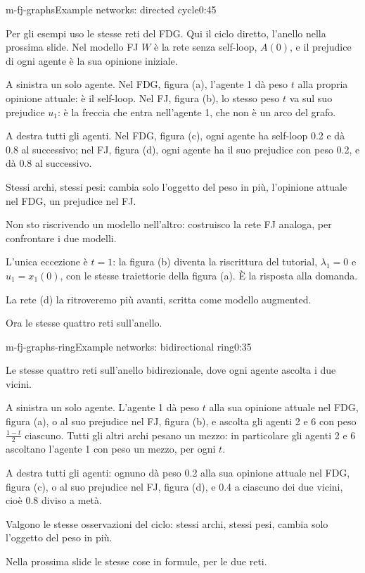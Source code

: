 \begin{slide}{m-fj-graphs}{Example networks: directed cycle}{0:45}
  \begin{discorso}
    \item Per gli esempi uso le stesse reti del FDG. Qui il ciclo diretto, l'anello nella prossima slide. Nel modello FJ $W$ è la rete senza self-loop, $A(0)$, e il prejudice di ogni agente è la sua opinione iniziale.
    \item A sinistra un solo agente. Nel FDG, figura (a), l'agente 1 dà peso $t$ alla propria opinione attuale: è il self-loop. Nel FJ, figura (b), lo stesso peso $t$ va sul suo prejudice $u_1$: è la freccia che entra nell'agente 1, che non è un arco del grafo.
    \item A destra tutti gli agenti. Nel FDG, figura (c), ogni agente ha self-loop 0.2 e dà 0.8 al successivo; nel FJ, figura (d), ogni agente ha il suo prejudice con peso 0.2, e dà 0.8 al successivo.
    \item Stessi archi, stessi pesi: cambia solo l'oggetto del peso in più, l'opinione attuale nel FDG, un prejudice nel FJ.
    \item Non sto riscrivendo un modello nell'altro: costruisco la rete FJ analoga, per confrontare i due modelli.
    \item L'unica eccezione è $t=1$: la figura (b) diventa la riscrittura del tutorial, $\lambda_1=0$ e $u_1=x_1(0)$, con le stesse traiettorie della figura (a). È la risposta alla domanda.
    \item La rete (d) la ritroveremo più avanti, scritta come modello augmented.
    \item Ora le stesse quattro reti sull'anello.
  \end{discorso}
\end{slide}

\begin{slide}{m-fj-graphs-ring}{Example networks: bidirectional ring}{0:35}
  \begin{discorso}
    \item Le stesse quattro reti sull'anello bidirezionale, dove ogni agente ascolta i due vicini.
    \item A sinistra un solo agente. L'agente 1 dà peso $t$ alla sua opinione attuale nel FDG, figura (a), o al suo prejudice nel FJ, figura (b), e ascolta gli agenti 2 e 6 con peso $\frac{1-t}{2}$ ciascuno. Tutti gli altri archi pesano un mezzo: in particolare gli agenti 2 e 6 ascoltano l'agente 1 con peso un mezzo, per ogni $t$.
    \item A destra tutti gli agenti: ognuno dà peso 0.2 alla sua opinione attuale nel FDG, figura (c), o al suo prejudice nel FJ, figura (d), e 0.4 a ciascuno dei due vicini, cioè 0.8 diviso a metà.
    \item Valgono le stesse osservazioni del ciclo: stessi archi, stessi pesi, cambia solo l'oggetto del peso in più.
    \item Nella prossima slide le stesse cose in formule, per le due reti.
  \end{discorso}
\end{slide}

